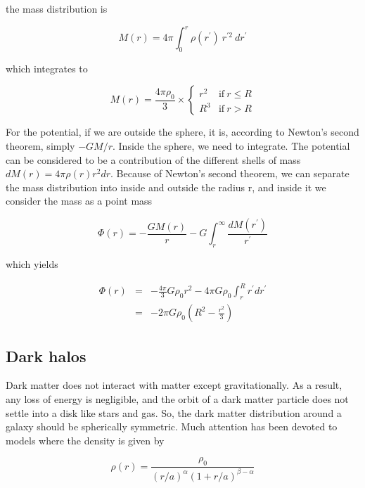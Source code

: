 the mass distribution is 

\begin{equation}
M(r) =  4\pi \int_0^{r} \rho(r^\prime) \ r^{\prime 2} \ dr^\prime 
\end{equation}

which integrates to 

\begin{equation}
M(r) = \frac{4\pi \rho_0}{3}\times\left\{ \begin{array}{cc} 
r^2 & \mathrm{if} \ r \leq R \\
R^3 & \mathrm{if} \ r > R
\end{array} \right.
\end{equation}


For the potential, if we are outside the sphere, it is, according to Newton's second theorem, simply $-GM/r$. Inside the sphere, we need to integrate. The potential can be considered to be a contribution of the different shells of mass $dM(r) = 4\pi \rho(r) r^2 dr$. Because of Newton's second theorem, we can separate the mass distribution into inside and outside the radius r, and inside it we consider the mass as a point mass 

\begin{equation}
\varPhi(r) = -\frac{G M(r)}{r} - G\int_r^\infty \frac{dM(r^\prime)}{r^\prime} 
\end{equation}


which yields 


\begin{eqnarray}
\varPhi(r) &=& -\frac{4\pi}{3} G\rho_0 r^2 - 4\pi G \rho_0 \int_r^R r^\prime dr^\prime \\
&=& -2\pi G \rho_0 \left( R^2 - \frac{r^2}{3}\right)
\end{eqnarray}

\subsection{Dark halos}

Dark matter does not interact with matter except gravitationally. As a result, any loss of energy is negligible, and the orbit of a dark matter particle does not settle into a disk like stars and gas. So, the dark matter distribution around a galaxy should be spherically symmetric. Much attention has been devoted to models where the density is given by 


\begin{equation}
\boxed{
\rho(r) = \frac{\rho_0}{(r/a)^\alpha (1+r/a)^{\beta-\alpha}}
}
\end{equation}


